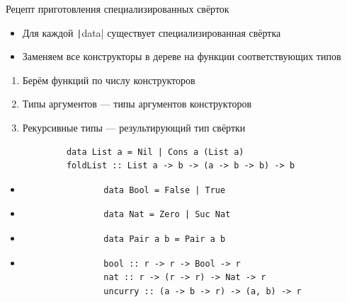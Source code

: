    \begin{frame}[fragile]{Рецепт приготовления специализированных свёрток}
        \begin{itemize}
            \item Для каждой \texttt|data| существует специализированная свёртка
            \item Заменяем все конструкторы в дереве на функции соответствующих типов
        \end{itemize}
        \begin{enumerate}
            \item Берём функций по числу конструкторов
            \item Типы аргументов --- типы аргументов конструкторов
            \item Рекурсивные типы --- результирующий тип свёртки
        \end{enumerate}
        \begin{verbatim}
            data List a = Nil | Cons a (List a)
            foldList :: List a -> b -> (a -> b -> b) -> b
        \end{verbatim}
        \begin{itemize}
            \item[\todo]
            \begin{verbatim}
                data Bool = False | True
            \end{verbatim}
            \item[\todo]
            \begin{verbatim}
                data Nat = Zero | Suc Nat
            \end{verbatim}
            \item[\todo]
            \begin{verbatim}
                data Pair a b = Pair a b
            \end{verbatim}
            \item[\answer] \pause
            \begin{verbatim}
                bool :: r -> r -> Bool -> r
                nat :: r -> (r -> r) -> Nat -> r
                uncurry :: (a -> b -> r) -> (a, b) -> r
            \end{verbatim}
        \end{itemize}
    \end{frame}

